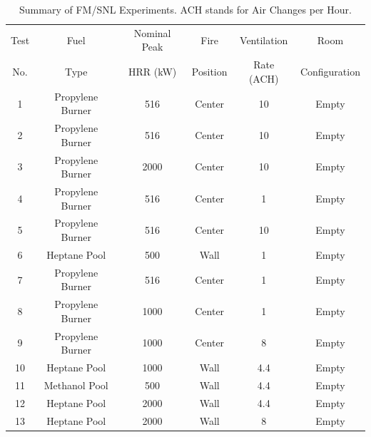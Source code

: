 \begin{table}[h!]
\caption[Summary of FM/SNL Experiments]{Summary of FM/SNL Experiments. ACH stands for Air Changes per Hour.}
\begin{center}
\begin{tabular}{|c|c|c|c|c|c|}
\hline
Test    &  Fuel             & Nominal Peak  & Fire          & Ventilation       & Room                   \\
No.     &  Type             & HRR (kW)      & Position      & Rate (ACH)        & Configuration          \\ \hline \hline
1       & Propylene Burner  &     516       & Center        & 10                & Empty                  \\ \hline
2       & Propylene Burner  &     516       & Center        & 10                & Empty                  \\ \hline
3       & Propylene Burner  &    2000       & Center        & 10                & Empty                  \\ \hline
4       & Propylene Burner  &     516       & Center        & 1                 & Empty                  \\ \hline
5       & Propylene Burner  &     516       & Center        & 10                & Empty                  \\ \hline
6       & Heptane Pool      &     500       & Wall          & 1                 & Empty                  \\ \hline
7       & Propylene Burner  &     516       & Center        & 1                 & Empty                  \\ \hline
8       & Propylene Burner  &    1000       & Center        & 1                 & Empty                  \\ \hline
9       & Propylene Burner  &    1000       & Center        & 8                 & Empty                  \\ \hline
10      & Heptane Pool      &    1000       & Wall          & 4.4               & Empty                  \\ \hline
11      & Methanol Pool     &     500       & Wall          & 4.4               & Empty                  \\ \hline
12      & Heptane Pool      &    2000       & Wall          & 4.4               & Empty                  \\ \hline
13      & Heptane Pool      &    2000       & Wall          & 8                 & Empty                  \\ \hline

\end{tabular}
\end{center}
\end{table}
